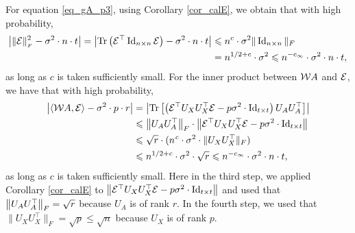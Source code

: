 	For equation \eqref{eq_gA_p3}, using Corollary \ref{cor_calE},
	we obtain that with high probability,
	\begin{align}
		\left\lvert\|\mathcal{E}\|_{_{F}}^2 - \sigma^2 \cdot n \cdot t\right\rvert=\left\lvert\operatorname{Tr}\left( \mathcal E^\top \operatorname{Id}_{n\times n}\mathcal E\right) - \sigma^2 \cdot n \cdot t\right\rvert &\leqslant n^{c} \cdot \sigma^2 \| \operatorname{Id}_{n\times n}\|_F \nonumber\\
		&= n^{1/2+c} \cdot \sigma^2 \leqslant n^{-c_{\infty}} \cdot \sigma^2 \cdot n \cdot t, \label{eq_gA_err3}
	\end{align}
	as long as $c$ is taken sufficiently small. 
	For the inner product between ${\mathcal W} A$ and $\mathcal{E}$, we have that with high probability,
	\begin{align}
		{\left| {\langle {\mathcal W}A, \mathcal{E}\rangle - \sigma^2\cdot p \cdot r } \right|} &= {\left| {\operatorname{Tr}\left[\left(\mathcal{E}^\top U_X U_X^{\top}\mathcal{E}  - p\sigma^2 \cdot  \operatorname{Id}_{t\times t} \right)  U_AU_A^{\top} \right]} \right|} \nonumber  \\
		&\leqslant \left\| U_{A} U_A^{\top} \right\|_{F} \cdot \left\| \mathcal{E}^\top U_X U_X^{\top} \mathcal{E} - p \sigma^2 \cdot  \operatorname{Id}_{t\times t} \right\| \nonumber \\
		&\leqslant \sqrt{r} \cdot (n^{{\mathit{c}}}\cdot \sigma^2\cdot \|U_X U_X^\top\|_F) \nonumber \\
		&\leqslant n^{1/2+c} \cdot \sigma^2 \cdot \sqrt{r}  \leqslant  n^{-c_{\infty}} \cdot \sigma^2 \cdot n \cdot t ,\label{eq_gA_err4}
	\end{align}
as long as $c$ is taken sufficiently small. Here in the third step, we applied Corollary \ref{cor_calE} to $\left\| \mathcal{E}^\top U_X U_X^{\top} \mathcal{E} - p \sigma^2 \cdot  \operatorname{Id}_{t\times t} \right\|$ and used that $ \left\| U_{A} U_A^{\top} \right\|_{F}=\sqrt{r}$ because $U_A$ is of rank $r$. In the fourth step, we used that $\|U_X U_X^\top\|_F=\sqrt{p}\le \sqrt{n}$ because $U_X$ is of rank $p$.

